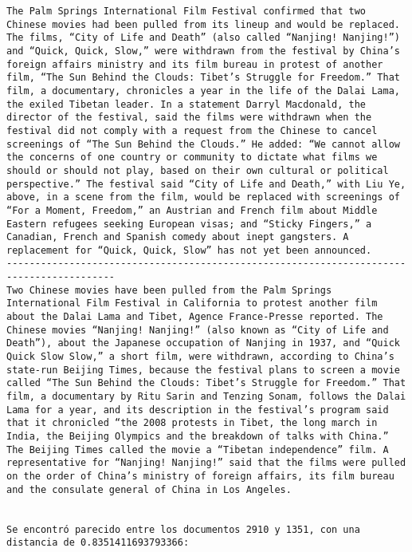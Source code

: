 \documentclass[11pt]{article}
\begin{document}
\begin{Verbatim}[commandchars=\\\{\}]
The Palm Springs International Film Festival confirmed that two Chinese movies had been pulled from its lineup and would be replaced. The films, “City of Life and Death” (also called “Nanjing! Nanjing!”) and “Quick, Quick, Slow,” were withdrawn from the festival by China’s foreign affairs ministry and its film bureau in protest of another film, “The Sun Behind the Clouds: Tibet’s Struggle for Freedom.” That film, a documentary, chronicles a year in the life of the Dalai Lama, the exiled Tibetan leader. In a statement Darryl Macdonald, the director of the festival, said the films were withdrawn when the festival did not comply with a request from the Chinese to cancel screenings of “The Sun Behind the Clouds.” He added: “We cannot allow the concerns of one country or community to dictate what films we should or should not play, based on their own cultural or political perspective.” The festival said “City of Life and Death,” with Liu Ye, above, in a scene from the film, would be replaced with screenings of “For a Moment, Freedom,” an Austrian and French film about Middle Eastern refugees seeking European visas; and “Sticky Fingers,” a Canadian, French and Spanish comedy about inept gangsters. A replacement for “Quick, Quick, Slow” has not yet been announced.
-----------------------------------------------------------------------------------------
Two Chinese movies have been pulled from the Palm Springs International Film Festival in California to protest another film about the Dalai Lama and Tibet, Agence France-Presse reported. The Chinese movies “Nanjing! Nanjing!” (also known as “City of Life and Death”), about the Japanese occupation of Nanjing in 1937, and “Quick Quick Slow Slow,” a short film, were withdrawn, according to China’s state-run Beijing Times, because the festival plans to screen a movie called “The Sun Behind the Clouds: Tibet’s Struggle for Freedom.” That film, a documentary by Ritu Sarin and Tenzing Sonam, follows the Dalai Lama for a year, and its description in the festival’s program said that it chronicled “the 2008 protests in Tibet, the long march in India, the Beijing Olympics and the breakdown of talks with China.” The Beijing Times called the movie a “Tibetan independence” film. A representative for “Nanjing! Nanjing!” said that the films were pulled on the order of China’s ministry of foreign affairs, its film bureau and the consulate general of China in Los Angeles.


Se encontró parecido entre los documentos 2910 y 1351, con una distancia de 0.8351411693793366:



\end{Verbatim}
\end{document}
